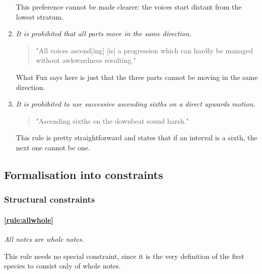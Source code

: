 \begin{enumerate}[wide, label=\bfseries 1.P\arabic*]
    This preference cannot be made clearer: the voices start distant from the lowest stratum.

    \item\label{rule:same-movement} \reddot \textit{It is prohibited that all parts move in the same direction.}

    \begin{quotation}
    "All voices ascend[ing] [is] a progression which can hardly be managed without awkwardness resulting."
    \textcite[p.76]{GaPEng}
    \end{quotation}

    What Fux says here is just that the three parts cannot be moving in the same direction. 

    \item\label{rule:ascending-sixths} \reddot \textit{It is prohibited to use successive ascending sixths on a direct upwards motion.}

    \begin{quotation}
    "Ascending sixths on the downbeat sound harsh."
    \textcite[p.77]{GaPEng}
    \end{quotation}

    This rule is pretty straightforward and states that if an interval is a sixth, the next one cannot be one.
\end{enumerate}

\subsection{Formalisation into constraints}
\subsubsection{Structural constraints}
    \paragraph{\hspace{0.6cm}\ref{rule:allwhole}} \textit{All notes are whole notes.}
    
    This rule needs no special constraint, since it is the very definition of the first species  to consist only of whole notes.

